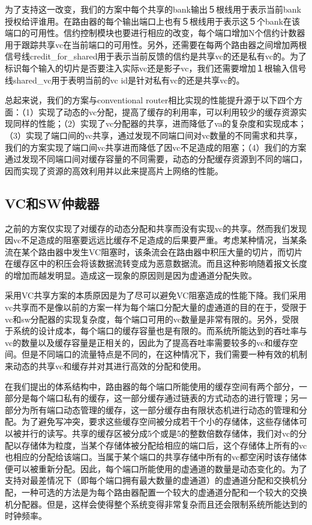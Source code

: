﻿\documentclass[10pt,journal]{IEEEtran}
\begin{document}
为了支持这一改变，我们的方案中每个共享的bank输出５根线用于表示当前bank授权给评谁用。在路由器的每个输出端口上也有５根线用于表示这５个bank在该端口的可用性。信约控制模块也要进行相应的改变，每个端口增加N个信约计数器用于跟踪共享vc在当前端口的可用性。另外，还需要在每两个路由器之间增加两根信号线credit\_for\_shared用于表示当前反馈的信约是共享vc的还是私有vc的。为了标识每个输入的切片是否要注入实际vc还是影子vc，我们还需要增加１根输入信号线shared\_vc用于表明当前的vc id是针对私有vc的还是共享vc的。

总起来说，我们的方案与conventional router相比实现的性能提升源于以下四个方面：（1）实现了动态的vc分配，提高了缓存的利用率，可以利用较少的缓存资源实现同样的性能；（2）实现了vc分配器的共享，进而降低了va的复杂度和实现成本；（3）实现了端口间的vc共享，通过发现不同端口间对vc数量的不同需求和共享，我们的方案实现了端口间vc共享进而降低了因vc不足造成的阻塞；（4）我们的方案通过发现不同端口间对缓存容量的不同需要，动态的分配缓存资源到不同的端口，因而实现了资源的高效利用并以此来提高片上网络的性能。

\subsection{VC和SW仲裁器}
之前的方案仅实现了对缓存的动态分配和共享而没有实现vc的共享。然而我们发现因vc不足造成的阻塞要远远比缓存不足造成的后果要严重。考虑某种情况，当某条流在某个路由器中发生VC阻塞时，该条流会在路由器中积压大量的切片，而切片在缓存区中的积压会将该数据流转变成为恶意数据流。而且这种影响随着报文长度的增加而越发明显。造成这一现象的原因则是因为虚通道分配失败。

采用VC共享方案的本质原因是为了尽可以避免VC阻塞造成的性能下降。我们采用vc共享而不是像以前的方案一样为每个端口分配大量的虚通道的目的在于，受限于vc和sw分配器的实现复杂度，每个端口可用的vc数量是非常有限的。另外，受限于系统的设计成本，每个端口的缓存容量也是有限的。而系统所能达到的吞吐率与vc的数量以及缓存容量是正相关的，因此为了提高吞吐率需要较多的vc和缓存空间。但是不同端口的流量特点是不同的，在这种情况下，我们需要一种有效的机制来动态的共享vc和缓存并对其进行高效的分配和使用。

在我们提出的体系结构中，路由器的每个端口所能使用的缓存空间有两个部分，一部分是每个端口私有的缓存，这一部分缓存通过链表的方式动态的进行管理；另一部分为所有端口动态管理的缓存，这一部分缓存由有限状态机进行动态的管理和分配。为了避免写冲突，要求这些缓存空间被分成若干个小的存储体，这些存储体可以被并行的读写。共享的缓存区被分成5个或是5的整数倍数存储体，我们对vc的分配以存储体为粒度，当某个存储体被分配给相应的端口后，这个存储体上所有的vc也相应的分配给该端口。当属于某个端口的共享存储中所有的vc都空闲时该存储体便可以被重新分配。因此，每个端口所能使用的虚通道的数量是动态变化的。为了支持对最差情况下（即每个端口拥有最大数量的虚通道）的虚通道分配和交换机分配，一种可选的方法是为每个路由器配置一个较大的虚通道分配和一个较大的交换机分配器。但是，这样会使得整个系统变得非常复杂而且还会限制系统所能达到的时钟频率。
\end{document}
